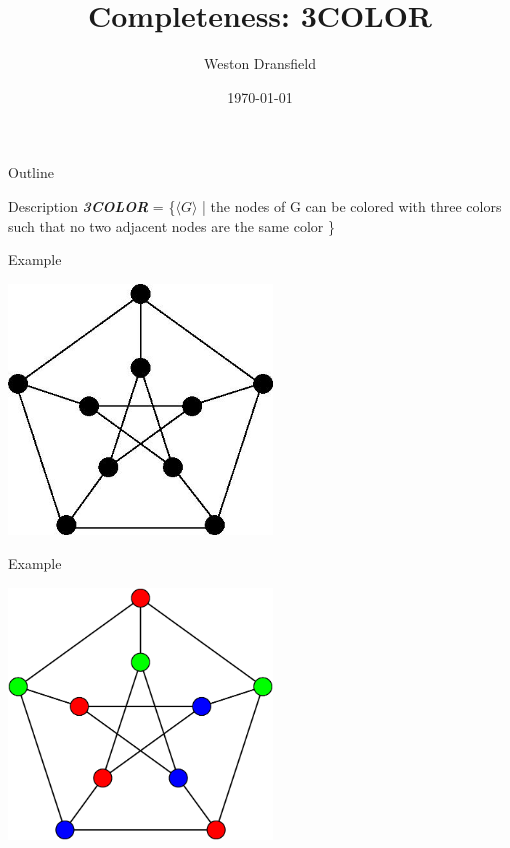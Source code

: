 \documentclass[bigger]{beamer}
\author{Weston Dransfield}
\date{\today}
\title{Completeness: 3COLOR}
\begin{document}
\maketitle
\begin{frame}{Outline}
\tableofcontents
\end{frame}


\begin{frame}[label=sec-1]{Description}
\textbf{\textit{3COLOR}} = \{\(\langle G \rangle\) | the nodes of G can be colored with three colors such that no two adjacent nodes are the same color \}
\end{frame}

\begin{frame}[label=sec-2]{Example}
\begin{center}
\includegraphics[width=7cm]{uncolored.jpg}
\end{center}
\end{frame}

\begin{frame}[label=sec-3]{Example}
\begin{center}
\includegraphics[width=7cm]{colored.png}
\end{center}
\end{frame}
\end{document}
